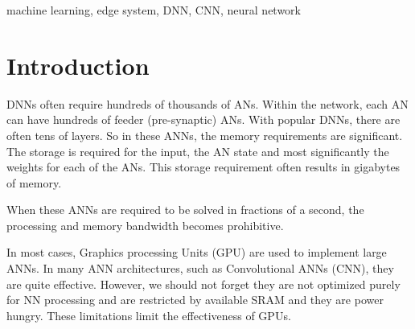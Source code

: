 \documentclass[journal]{IEEEtran}
\begin{document}
\begin{IEEEkeywords}
machine learning, edge system, DNN, CNN, neural network
\end{IEEEkeywords}






%
\IEEEpeerreviewmaketitle



\section{Introduction}
% 
% 
% 
% 
 DNNs often require hundreds of thousands of ANs.
Within the network, each AN can have hundreds of feeder (pre-synaptic) ANs.
With popular DNNs, there are often tens of layers. 
So in these ANNs, the memory requirements are significant. The storage is required for the input, the AN state and most significantly the weights for each of the ANs. This storage requirement often results in gigabytes of memory.

When these ANNs are required to be solved in fractions of a second, the processing and memory bandwidth becomes prohibitive.

In most cases, Graphics processing Units (GPU) are used to implement large ANNs. In many ANN architectures, such as Convolutional ANNs (CNN), they are quite effective. However, we should not forget they are not optimized purely for 
NN processing and are restricted by available SRAM and they are power hungry. These limitations limit the effectiveness of GPUs.
\end{document}
